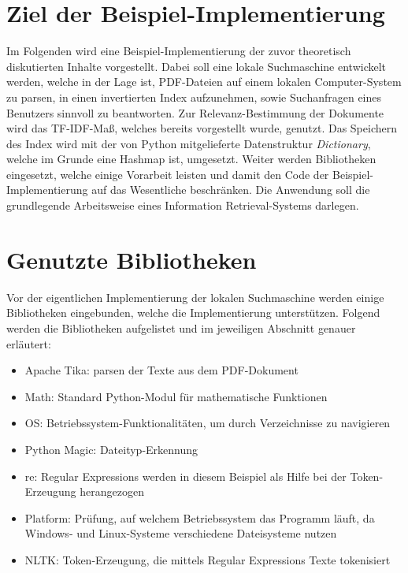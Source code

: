 \section{Ziel der Beispiel-Implementierung}\label{ziel-der-beispiel-implementierung}

Im Folgenden wird eine Beispiel-Implementierung der zuvor theoretisch diskutierten Inhalte vorgestellt. Dabei soll eine lokale Suchmaschine entwickelt werden, welche in der Lage ist, PDF-Dateien auf einem lokalen Computer-System zu parsen, in einen invertierten Index aufzunehmen, sowie Suchanfragen eines Benutzers sinnvoll zu beantworten. Zur Relevanz-Bestimmung der Dokumente wird das TF-IDF-Maß, welches bereits vorgestellt wurde, genutzt. Das Speichern des Index wird mit der von Python mitgelieferte Datenstruktur \textit{Dictionary}, welche im Grunde eine Hashmap ist, umgesetzt. Weiter werden Bibliotheken eingesetzt, welche einige Vorarbeit leisten und damit den Code der Beispiel-Implementierung auf das Wesentliche beschränken. Die Anwendung soll die grundlegende Arbeitsweise eines Information Retrieval-Systems darlegen.

\section{Genutzte Bibliotheken}\label{genutzte-bibliotheken}

Vor der eigentlichen Implementierung der lokalen Suchmaschine werden einige Bibliotheken eingebunden, welche die Implementierung unterstützen. Folgend werden die Bibliotheken aufgelistet und im jeweiligen Abschnitt genauer erläutert:
\begin{itemize}
	\item Apache Tika: parsen der Texte aus dem PDF-Dokument
	\item Math: Standard Python-Modul für mathematische Funktionen
	\item OS: Betriebssystem-Funktionalitäten, um durch Verzeichnisse zu navigieren
	\item Python Magic: Dateityp-Erkennung
	\item re: Regular Expressions werden in diesem Beispiel als Hilfe bei der Token-Erzeugung herangezogen
	\item Platform: Prüfung, auf welchem Betriebssystem das Programm läuft, da Windows- und Linux-Systeme verschiedene Dateisysteme nutzen
	\item NLTK: Token-Erzeugung, die mittels Regular Expressions Texte tokenisiert
\end{itemize}

